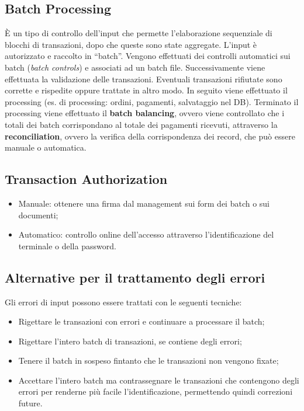 \subsection{Batch Processing}
È un tipo di controllo dell'input che permette l'elaborazione sequenziale di
blocchi di transazioni, dopo che queste sono state aggregate. L'input è
autorizzato e raccolto in ``batch''. Vengono effettuati dei controlli
automatici sui batch  (\textit{batch controls}) e associati ad un batch file.
Successivamente viene effettuata la validazione delle transazioni. Eventuali 
transazioni rifiutate sono corrette e rispedite oppure trattate in altro modo.
In seguito viene effettuato il processing (es. di processing: ordini,
pagamenti, salvataggio nel DB). Terminato il processing viene effettuato il 
\textbf{batch balancing}, ovvero viene controllato che i totali dei batch
corrispondano al totale dei pagamenti ricevuti, attraverso la 
\textbf{reconciliation}, ovvero la verifica della corrispondenza dei record,
che può essere manuale o automatica.

\subsection{Transaction Authorization}
\begin{itemize}
    \item Manuale: ottenere una firma dal management sui form dei batch o sui
    documenti;
    \item Automatico: controllo online dell'accesso attraverso
    l'identificazione del terminale o della password.
\end{itemize}

\subsection{Alternative per il trattamento degli errori}
Gli errori di input possono essere trattati
con le seguenti tecniche:
\begin{itemize}
\item Rigettare le transazioni con errori e continuare a processare
il batch;
\item Rigettare l'intero batch di transazioni, se contiene
degli errori;
\item Tenere il batch in sospeso fintanto che le transazioni
non vengono fixate;
\item Accettare l'intero batch ma contrassegnare le transazioni che
contengono degli errori per renderne più facile l'identificazione,
permettendo quindi correzioni future.
\end{itemize}






